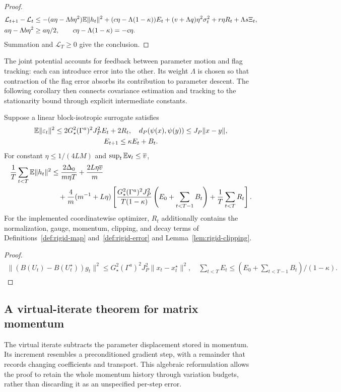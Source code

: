 \begin{proof}
\begin{align}
 \mathcal L_{t+1}-\mathcal L_t
 &\le-(a\eta-\Lambda b\eta^2)\mathbb E\|h_t\|^2
       +(c\eta-\Lambda(1-\kappa))E_t
       +(v+\Lambda q)\eta^2\sigma_t^2+r\eta R_t+\Lambda s\Xi_t,\\
 a\eta-\Lambda b\eta^2&\ge a\eta/2,\qquad
 c\eta-\Lambda(1-\kappa)=-c\eta.
\end{align}
Summation and $\mathcal L_T\ge0$ give the conclusion.
\end{proof}
The joint potential accounts for feedback between parameter motion and flag
tracking: each can introduce error into the other. Its weight $\Lambda$ is
chosen so that contraction of the flag error absorbs its contribution to
parameter descent. The following corollary then connects covariance estimation
and tracking to the stationarity bound through explicit intermediate constants.

\begin{corollary}\label{cor:tf-endtoend}
Suppose a linear block-isotropic surrogate satisfies
\begin{gather}
 \mathbb E\|\varepsilon_t\|^2\le
   2G_\star^2(\Gamma^a)^2J_P^2 E_t+2R_t,\quad
 d_P(\psi(x),\psi(y))\le J_P\|x-y\|,\\
 E_{t+1}\le\kappa E_t+B_t.
\end{gather}
For constant $\eta\le1/(4LM)$ and $\sup_t\mathbb E\mathsf v_t\le\overline v$,
\begin{align}
 \frac1T\sum_{t<T}\mathbb E\|h_t\|^2
 &\le\frac{2\Delta_0}{m\eta T}+\frac{2L\eta\overline v}{m}\\
 &\quad+\frac4m(m^{-1}+L\eta)\left[
 \frac{G_\star^2(\Gamma^a)^2J_P^2}{T(1-\kappa)}
             \left(E_0+\sum_{t<T-1}B_t\right)+\frac1T\sum_{t<T}R_t\right].
\end{align}
For the implemented coordinatewise optimizer, $R_t$ additionally contains the
normalization, gauge, momentum, clipping, and decay terms of
Definitions~\ref{def:rigid-map} and~\ref{def:rigid-error} and
Lemma~\ref{lem:rigid-clipping}.
\end{corollary}
\begin{proof}
\begin{gather}
 \|(B(U_t)-B(U_t^\star))g_t\|^2
 \le G_\star^2(\Gamma^a)^2J_P^2\|x_t-x_t^\star\|^2,\quad
 \sum_{t<T}E_t\le(E_0+\sum_{t<T-1}B_t)/(1-\kappa).
\end{gather}
\end{proof}
\subsection{A virtual-iterate theorem for matrix momentum}
The virtual iterate subtracts the parameter displacement stored in momentum.
Its increment resembles a preconditioned gradient step, with a remainder that
records changing coefficients and transport. This algebraic reformulation
allows the proof to retain the whole momentum history through variation
budgets, rather than discarding it as an unspecified per-step error.

